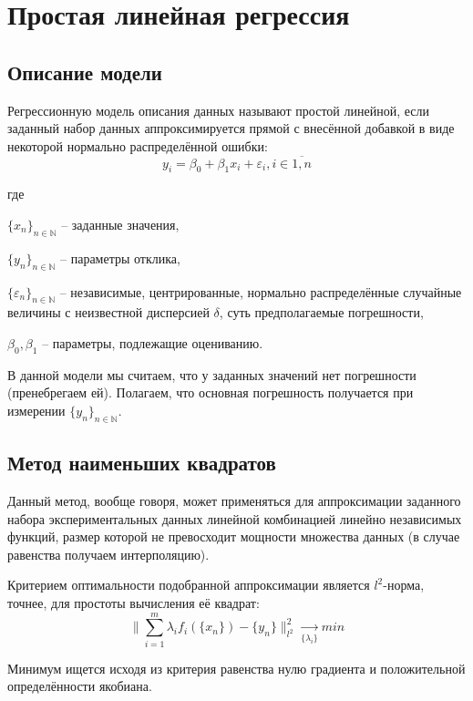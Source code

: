 \section{Простая линейная регрессия}
\subsection{Описание модели}

Регрессионную модель описания данных называют простой линейной, если заданный набор данных аппроксимируется прямой с внесённой добавкой в виде некоторой нормально распределённой ошибки:
\begin{equation}
y_i = \beta_0 + \beta_1 x_i + \varepsilon_i, i \in \overline{1,n}
\end{equation}

где 

$\{x_n\}_{n \in \mathbb{N}}$ -- заданные значения,

$\{y_n\}_{n \in \mathbb{N}}$ -- параметры отклика,

$\{\varepsilon_n\}_{n \in \mathbb{N}}$ -- независимые, центрированные, нормально распределённые случайные величины с неизвестной дисперсией $\delta$, суть предполагаемые погрешности,

$\beta_0, \beta_1$ -- параметры, подлежащие оцениванию.

В данной модели мы считаем, что у заданных значений нет погрешности (пренебрегаем ей). Полагаем, что основная погрешность получается при измерении $\{y_n\}_{n \in \mathbb{N}}$.

\subsection{Метод наименьших квадратов}

Данный метод, вообще говоря, может применяться для аппроксимации заданного набора экспериментальных данных линейной комбинацией линейно независимых функций, размер которой не превосходит мощности множества данных (в случае равенства получаем интерполяцию).

Критерием оптимальности подобранной аппроксимации является $l^2$-норма, точнее, для простоты вычисления её квадрат:
\begin{equation}\label{eq:lsm}
\|\displaystyle \sum_{i=1}^{m} \lambda_if_i(\{x_n\}) - \{y_n\} \|_{l^2}^{2} \underset{\{\lambda_i\}}{\longrightarrow} min
\end{equation}

Минимум ищется исходя из критерия равенства нулю градиента и положительной определённости якобиана.

